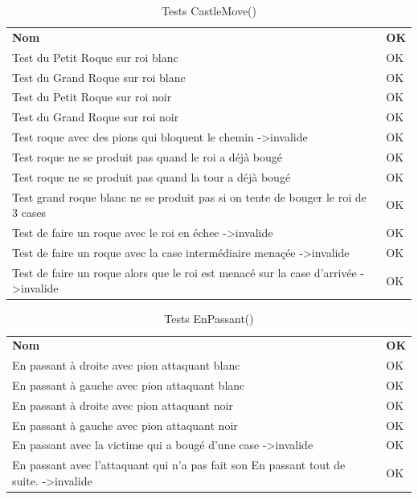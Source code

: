 \documentclass[12pt]{article}
\begin{document}
\begin{table}[h!]
\caption{Tests CastleMove()}
\begin{tabular}{ll}
\textbf{Nom}                                                                                    & \textbf{OK} \\
Test du Petit Roque sur roi blanc                                                               & OK \\
Test du Grand Roque sur roi blanc                                                               & OK \\
Test du Petit Roque sur roi noir                                                                & OK \\
Test du Grand Roque sur roi noir                                                                & OK \\
Test roque avec des pions qui bloquent le chemin -\textgreater invalide                         & OK \\
Test roque ne se produit pas quand le roi a déjà bougé                                          & OK \\
Test roque ne se produit pas quand la tour a déjà bougé                                         & OK \\
Test grand roque blanc ne se produit pas si on tente de bouger le roi de 3 cases                & OK \\
Test de faire un roque avec le roi en échec -\textgreater invalide                              & OK \\
Test de faire un roque avec la case intermédiaire menaçée -\textgreater invalide                & OK \\
Test de faire un roque alors que le roi est menacé sur la case d'arrivée -\textgreater invalide & OK
\end{tabular}
\end{table}

\begin{table}[h!]
\caption{Tests EnPassant()}
\begin{tabular}{ll}
\textbf{Nom}                                                                                      & \textbf{OK }\\
En passant à droite avec pion attaquant blanc                                                     & OK \\
En passant à gauche avec pion attaquant blanc                                                     & OK \\
En passant à droite avec pion attaquant noir                                                      & OK \\
En passant à gauche avec pion attaquant noir                                                      & OK \\
En passant avec la victime qui a bougé d'une case -\textgreater invalide                          & OK \\
En passant avec l'attaquant qui n'a pas fait son En passant tout de suite. -\textgreater invalide & OK
\end{tabular}
\end{table}
\end{document}
